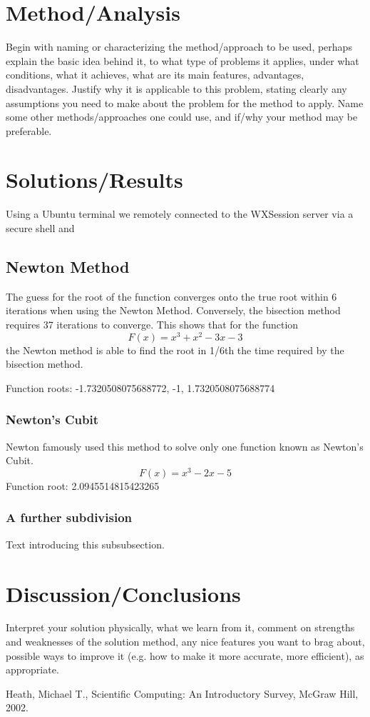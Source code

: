 \documentclass[11pt]{article}
\begin{document}
\section{Method/Analysis}\label{S:3}
Begin with naming or characterizing the method/approach to be used, perhaps explain the basic idea behind it, to what type of problems it applies, under what conditions, what it achieves, what are its main features, advantages, disadvantages. Justify why it is applicable to this problem, stating clearly any assumptions you need to make about the problem for the method to apply. Name some other methods/approaches one could use, and if/why your method may be preferable.


\section{Solutions/Results}\label{S:4}
Using a Ubuntu terminal we remotely connected to the WXSession server via a secure shell and 

\subsection{Newton Method}
%
The guess for the root of the function converges onto the true root within 6 iterations when using the Newton Method. Conversely, the bisection method requires 37 iterations to converge. This shows that for the function \[F(x)=x^3+x^2-3x-3\] the Newton method is able to find the root in 1/6th the time required by the bisection method.

Function roots: -1.7320508075688772, -1, 1.7320508075688774
\subsubsection{Newton's Cubit}
%
Newton famously used this method to solve only one function known as Newton's Cubit. \[F(x)=x^3-2x-5\]
Function root: 2.0945514815423265  

\subsubsection{A further subdivision}
%
Text introducing this subsubsection. 

\section{Discussion/Conclusions}\label{S:5}
Interpret your solution physically, what we learn from it, comment on strengths and weaknesses of the solution method, any nice features you want to brag about, possible ways to improve it (e.g. how to make it more accurate, more efficient), as appropriate.


\begin{thebibliography}{100}
Heath, Michael T., Scientific Computing: An Introductory Survey, McGraw Hill, 2002.
%
%

\end{thebibliography}
\end{document}
